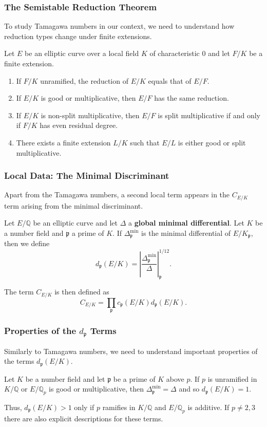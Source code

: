 \documentclass{beamer}
\newcommand{\QQ}{\mathbb{Q}}
\newcommand{\pp}{\mathfrak{p}}
\theoremstyle{plain}
\begin{document}
\begin{frame}
    \frametitle{The Semistable Reduction Theorem}
    To study Tamagawa numbers in our context, we need to understand how reduction types change under finite extensions.
    \begin{lemma}
        Let $E$ be an elliptic curve over a local field $K$ of characteristic $0$ and let $F/K$ be a finite extension.
        \begin{enumerate}
            \item If $F/K$ unramified, the reduction of $E/K$ equals that of $E/F$.
            \item If $E/K$ is good or multiplicative, then $E/F$ has the same reduction.
            \item If $E/K$ is non-split multiplicative, then $E/F$ is split multiplicative if and only if $F/K$ has even residual degree. 
            \item There exists a finite extension $L/K$ such that $E/L$ is either good or split multiplicative.
        \end{enumerate}
    \end{lemma}    

\end{frame}

\begin{frame}
    \frametitle{Local Data: The Minimal Discriminant}
    Apart from the Tamagawa numbers, a second local term appears in the $C_{E/K}$ term arising from the minimal discriminant.
    \begin{definition}
        Let $E/\QQ$ be an elliptic curve and let $\Delta$ a \textbf{global minimal differential}. Let $K$ be a number field and $\pp$ a prime of $K$. If $\Delta_{\pp}^{\min}$ is the minimal differential of $E/K_\pp$, then we define 
        $$d_\pp(E/K)=\left|\frac{\Delta_\pp^{\min}}{\Delta}\right|_\pp^{1/12}.$$
    \end{definition}
    The term $C_{E/K}$ is then defined as 
    $$C_{E/K}=\prod_{\pp}c_\pp(E/K)d_\pp(E/K).$$
\end{frame}

\begin{frame}
    \frametitle{Properties of the $d_\pp$ Terms}
    Similarly to Tamagawa numbers, we need to understand important properties of the terms $d_\pp(E/K)$.
    \begin{lemma}
        Let $K$ be a number field and let $\pp$ be a prime of $K$ above $p$. If $p$ is unramified in $K/\QQ$ or $E/\QQ_p$ is good or multiplicative, then $\Delta_\pp^{\min}=\Delta$ and so $d_\pp(E/K)=1$.
    \end{lemma}
    
    Thus, $d_\pp(E/K)>1$ only if $p$ ramifies in $K/\QQ$ and $E/\QQ_p$ is additive. If $p\neq 2,3$ there are also explicit descriptions for these terms.

\end{frame}
\end{document}
